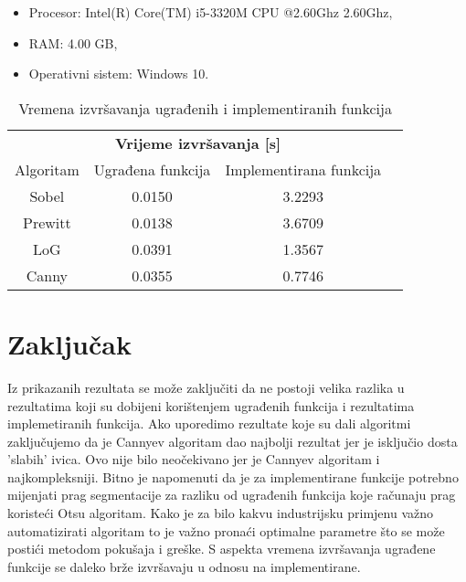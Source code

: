 ﻿\documentclass[conference]{IEEEtran}
\begin{document}
\begin{itemize}
    \item Procesor:  Intel(R) Core(TM) i5-3320M CPU @2.60Ghz 2.60Ghz,
    \item RAM: 4.00 GB,
    \item Operativni sistem: Windows 10.
\end{itemize} 

\begin{table}[h!]
\begin{center}
\caption{Vremena izvršavanja ugrađenih i implementiranih funkcija}
\begin{tabular}{|c|c|c|l}
\cline{1-3}
\multicolumn{3}{|c|}{\textbf{Vrijeme izvršavanja {[}s{]}}} &  \\ \cline{1-3}
Algoritam  & Ugrađena funkcija  & Implementirana funkcija  &  \\ \cline{1-3}
Sobel      & 0.0150             & 3.2293                   &  \\ \cline{1-3}
Prewitt    & 0.0138             & 3.6709                   &  \\ \cline{1-3}
LoG        & 0.0391             & 1.3567                   &  \\ \cline{1-3}
Canny      & 0.0355             &   0.7746                        &  \\ \cline{1-3}

\end{tabular}

\end{center}
\end{table}
\section{Zaključak}
Iz prikazanih rezultata se može zaključiti da ne postoji velika razlika u rezultatima koji su dobijeni korištenjem ugrađenih funkcija i rezultatima implemetiranih funkcija. Ako uporedimo rezultate koje su dali algoritmi zaključujemo da je Cannyev algoritam dao najbolji rezultat jer je isključio dosta 'slabih' ivica. Ovo nije bilo neočekivano jer je Cannyev algoritam i najkompleksniji. Bitno je napomenuti da je za implementirane funkcije potrebno mijenjati prag segmentacije za razliku od ugrađenih funkcija koje računaju prag koristeći Otsu algoritam. Kako je za bilo kakvu industrijsku primjenu važno automatizirati algoritam to je važno pronaći optimalne parametre što se može postići metodom pokušaja i greške. S aspekta vremena izvršavanja ugrađene funkcije se daleko brže izvršavaju u odnosu na implementirane.
\end{document}
